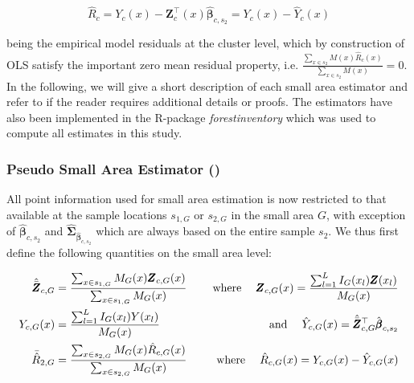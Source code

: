 \begin{equation}\label{eq:globresids}
\hat{R}_{c}=Y_{c}(x)-\pmb{Z}_{c}^{\top}(x)\hat{\pmb{\beta}}_{c,s_2} = Y_{c}(x) - \hat{Y}_{c}(x)
\end{equation}

\noindent being the empirical model residuals at the cluster level, which by construction of OLS satisfy the important zero mean residual property, i.e. $\frac{\sum_{x \in s_{2}} M(x) \hat{R}_{c}(x)}{\sum_{x \in s_{2}} M(x)}=0$.\\

In the following, we will give a short description of each small area estimator and refer to \citet{mandallaz2013a, mandallaz2016, mandallaz2013b} if the reader requires additional details or proofs. The estimators have also been implemented in the R-package \textit{forestinventory} \citep{forestinventory} which was used to compute all estimates in this study.\\



\subsubsection{Pseudo Small Area Estimator (\psmall{})}
\label{sec:psmall}

All point information used for small area estimation is now restricted to that available at the sample locations $s_{1,G}$ or $s_{2,G}$ in the small area $G$, with exception of $\hat{\pmb{\beta}}_{c,s_2}$ and $\hat{\pmb{\Sigma}}_{\hat{\pmb{\beta}}_{c,s_2}}$ which are always based on the entire sample $s_2$. We thus first define the following quantities on the small area level:

\begin{subequations}\label{eq:compsG}
	\begin{align}
	\hat{\bar{\pmb{Z}}}_{c,G} &= \frac{\sum_{x \in s_{1,G}} M_{G}(x) \pmb{Z}_{c,G}(x)}{\sum_{x \in s_{1,G}} M_{G}(x)} \label{eq:meanZcG} \hspace{3ex} &\text{where} \hspace{3ex}
	\pmb{Z}_{c,G}(x) =  \frac{\sum_{l=1}^{L} I_{G}(x_l)\pmb{Z}(x_l)}{M_{G}(x)}\\		
	Y_{c,G}(x) &= \frac{\sum_{l=1}^{L} I_{G}(x_l)Y(x_l)}{M_{G}(x)}  &\text{and} \hspace{3ex}
	\hat{Y}_{c,G}(x)=\hat{\bar{\pmb{Z}}}_{c,G}^{\top}\hat{\pmb{\beta}}_{c,s_2}\\
	\bar{\hat{R}}_{2,G} &= \frac{\sum_{x \in s_{2,G}} M_{G}(x) \hat{R}_{c,G}(x)}{\sum_{x \in s_{2,G}} M_{G}(x)} \hspace{3ex} &\text{where} \hspace{3ex}
	\hat{R}_{c,G}(x) = Y_{c,G}(x)-\hat{Y}_{c,G}(x)
	\end{align}
\end{subequations}

